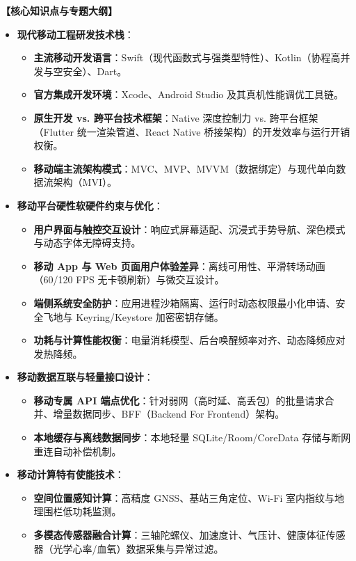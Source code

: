 \textbf{【核心知识点与专题大纲】}
\begin{itemize}
    \item \textbf{现代移动工程研发技术栈}：
    \begin{itemize}
        \item \textbf{主流移动开发语言}：Swift（现代函数式与强类型特性）、Kotlin（协程高并发与空安全）、Dart。
        \item \textbf{官方集成开发环境}：Xcode、Android Studio 及其真机性能调优工具链。
        \item \textbf{原生开发 vs. 跨平台技术框架}：Native 深度控制力 vs. 跨平台框架（Flutter 统一渲染管道、React Native 桥接架构）的开发效率与运行开销权衡。
        \item \textbf{移动端主流架构模式}：MVC、MVP、MVVM（数据绑定）与现代单向数据流架构（MVI）。
    \end{itemize}
    \item \textbf{移动平台硬性软硬件约束与优化}：
    \begin{itemize}
        \item \textbf{用户界面与触控交互设计}：响应式屏幕适配、沉浸式手势导航、深色模式与动态字体无障碍支持。
        \item \textbf{移动 App 与 Web 页面用户体验差异}：离线可用性、平滑转场动画（60/120 FPS 无卡顿刷新）与微交互设计。
        \item \textbf{端侧系统安全防护}：应用进程沙箱隔离、运行时动态权限最小化申请、安全飞地与 Keyring/Keystore 加密密钥存储。
        \item \textbf{功耗与计算性能权衡}：电量消耗模型、后台唤醒频率对齐、动态降频应对发热降频。
    \end{itemize}
    \item \textbf{移动数据互联与轻量接口设计}：
    \begin{itemize}
        \item \textbf{移动专属 API 端点优化}：针对弱网（高时延、高丢包）的批量请求合并、增量数据同步、BFF（Backend For Frontend）架构。
        \item \textbf{本地缓存与离线数据同步}：本地轻量 SQLite/Room/CoreData 存储与断网重连自动补偿机制。
    \end{itemize}
    \item \textbf{移动计算特有使能技术}：
    \begin{itemize}
        \item \textbf{空间位置感知计算}：高精度 GNSS、基站三角定位、Wi-Fi 室内指纹与地理围栏低功耗监测。
        \item \textbf{多模态传感器融合计算}：三轴陀螺仪、加速度计、气压计、健康体征传感器（光学心率/血氧）数据采集与异常过滤。

\end{itemize}
\end{itemize}
